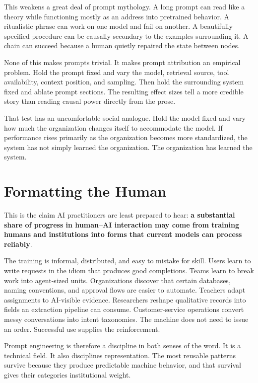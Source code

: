 \documentclass[11pt]{article}
\newcommand{\strong}[1]{\textbf{#1}}
\begin{document}
This weakens a great deal of prompt mythology. A long prompt can read like a theory while functioning mostly as an address into pretrained behavior. A ritualistic phrase can work on one model and fail on another. A beautifully specified procedure can be causally secondary to the examples surrounding it. A chain can succeed because a human quietly repaired the state between nodes.

None of this makes prompts trivial. It makes prompt attribution an empirical problem. Hold the prompt fixed and vary the model, retrieval source, tool availability, context position, and sampling. Then hold the surrounding system fixed and ablate prompt sections. The resulting effect sizes tell a more credible story than reading causal power directly from the prose.

That test has an uncomfortable social analogue. Hold the model fixed and vary how much the organization changes itself to accommodate the model. If performance rises primarily as the organization becomes more standardized, the system has not simply learned the organization. The organization has learned the system.

\section{Formatting the Human}

This is the claim AI practitioners are least prepared to hear: \strong{a substantial share of progress in human--AI interaction may come from training humans and institutions into forms that current models can process reliably}.

The training is informal, distributed, and easy to mistake for skill. Users learn to write requests in the idiom that produces good completions. Teams learn to break work into agent-sized units. Organizations discover that certain databases, naming conventions, and approval flows are easier to automate. Teachers adapt assignments to AI-visible evidence. Researchers reshape qualitative records into fields an extraction pipeline can consume. Customer-service operations convert messy conversations into intent taxonomies. The machine does not need to issue an order. Successful use supplies the reinforcement.

Prompt engineering is therefore a discipline in both senses of the word. It is a technical field. It also disciplines representation. The most reusable patterns survive because they produce predictable machine behavior, and that survival gives their categories institutional weight.
\end{document}
